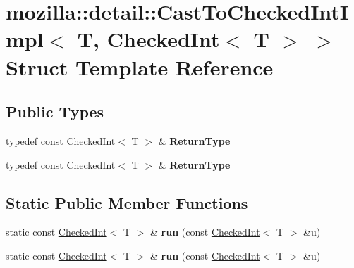 \hypertarget{structmozilla_1_1detail_1_1_cast_to_checked_int_impl_3_01_t_00_01_checked_int_3_01_t_01_4_01_4}{\section{mozilla\-:\-:detail\-:\-:Cast\-To\-Checked\-Int\-Impl$<$ T, Checked\-Int$<$ T $>$ $>$ Struct Template Reference}
\label{structmozilla_1_1detail_1_1_cast_to_checked_int_impl_3_01_t_00_01_checked_int_3_01_t_01_4_01_4}
}
\subsection*{Public Types}
\begin{DoxyCompactItemize}
\item 
\hypertarget{structmozilla_1_1detail_1_1_cast_to_checked_int_impl_3_01_t_00_01_checked_int_3_01_t_01_4_01_4_a66ba2e3da3d88360c9274d79b29a68d7}{typedef const \hyperlink{classmozilla_1_1_checked_int}{Checked\-Int}$<$ T $>$ \& {\bfseries Return\-Type}}\label{structmozilla_1_1detail_1_1_cast_to_checked_int_impl_3_01_t_00_01_checked_int_3_01_t_01_4_01_4_a66ba2e3da3d88360c9274d79b29a68d7}

\item 
\hypertarget{structmozilla_1_1detail_1_1_cast_to_checked_int_impl_3_01_t_00_01_checked_int_3_01_t_01_4_01_4_a66ba2e3da3d88360c9274d79b29a68d7}{typedef const \hyperlink{classmozilla_1_1_checked_int}{Checked\-Int}$<$ T $>$ \& {\bfseries Return\-Type}}\label{structmozilla_1_1detail_1_1_cast_to_checked_int_impl_3_01_t_00_01_checked_int_3_01_t_01_4_01_4_a66ba2e3da3d88360c9274d79b29a68d7}

\end{DoxyCompactItemize}
\subsection*{Static Public Member Functions}
\begin{DoxyCompactItemize}
\item 
\hypertarget{structmozilla_1_1detail_1_1_cast_to_checked_int_impl_3_01_t_00_01_checked_int_3_01_t_01_4_01_4_a95691c0e431a6c361064dcffa7621341}{static const \hyperlink{classmozilla_1_1_checked_int}{Checked\-Int}$<$ T $>$ \& {\bfseries run} (const \hyperlink{classmozilla_1_1_checked_int}{Checked\-Int}$<$ T $>$ \&u)}\label{structmozilla_1_1detail_1_1_cast_to_checked_int_impl_3_01_t_00_01_checked_int_3_01_t_01_4_01_4_a95691c0e431a6c361064dcffa7621341}

\item 
\hypertarget{structmozilla_1_1detail_1_1_cast_to_checked_int_impl_3_01_t_00_01_checked_int_3_01_t_01_4_01_4_a95691c0e431a6c361064dcffa7621341}{static const \hyperlink{classmozilla_1_1_checked_int}{Checked\-Int}$<$ T $>$ \& {\bfseries run} (const \hyperlink{classmozilla_1_1_checked_int}{Checked\-Int}$<$ T $>$ \&u)}\label{structmozilla_1_1detail_1_1_cast_to_checked_int_impl_3_01_t_00_01_checked_int_3_01_t_01_4_01_4_a95691c0e431a6c361064dcffa7621341}

\end{DoxyCompactItemize}

